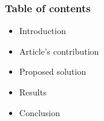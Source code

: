 \documentclass[%
  14pt,       				%
	c,                  %
	aspectratio=1610,   %
	unicode,						%
]{beamer}				    	%
\begin{document}
\disablenavigationsymbols

\maketitle

\begin{frame}
  \frametitle{Table of contents}
  \large{
    \begin{itemize}
      \item Introduction
      \item Article's contribution
      \item Proposed solution
      \item Results
      \item Conclusion
    \end{itemize}
  }
\end{frame}
\end{document}
